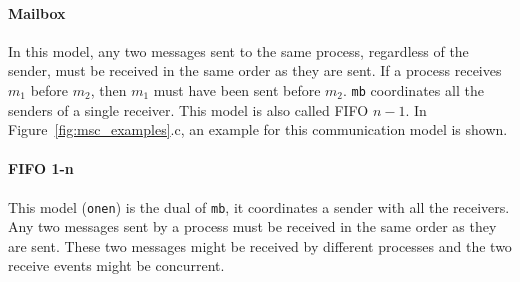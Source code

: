 

\paragraph{Mailbox}
In this model, any two messages sent to the same process, regardless of the sender, 
must be received in the same order as they are sent. If a process receives $m_1$ 
before $m_2$, then $m_1$ must have been sent before $m_2$. \verb|mb| coordinates all 
the senders of a single receiver. This model is also called FIFO $n-1$.
In Figure~\ref{fig:msc_examples}.c, an example for this communication model is shown.


\paragraph{FIFO 1-n}
This model (\verb|onen|) is the dual of \verb|mb|, it coordinates a sender with all the 
receivers. Any two messages sent by a process must be received in the same 
order as they are sent. These two messages might be received by different 
processes and the two receive events might be concurrent.


